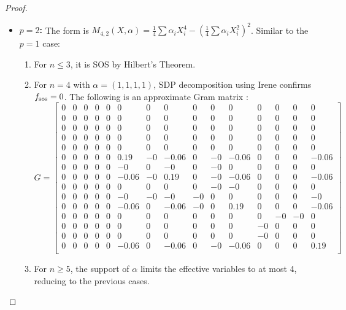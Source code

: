 \documentclass{article}
\begin{document}
\begin{proof}
\begin{itemize}
    \item \textbf{$p=2$:} The form is $M_{4,2}(X, \alpha) = \frac{1}{4}\sum \alpha_i X_i^4 - (\frac{1}{4}\sum \alpha_i X_i^2)^2$.
    Similar to the $p=1$ case:
    \begin{enumerate}
        \item For $n \leq 3$, it is SOS by Hilbert's Theorem.
        \item For $n=4$ with $\alpha=(1,1,1,1)$, SDP decomposition using Irene \cite{GMIr} confirms $f_{\rm sos}=0$. The following is an approximate Gram matrix \cite{GMIr}:
         {\scriptsize
         \setlength\arraycolsep{1.5pt}
         \[
            G = \begin{bmatrix}
            0 & 0 & 0 & 0 & 0 & 0 & 0 & 0 & 0 & 0 & 0 & 0 & 0 & 0 & 0 \\
            0 & 0 & 0 & 0 & 0 & 0 & 0 & 0 & 0 & 0 & 0 & 0 & 0 & 0 & 0 \\
            0 & 0 & 0 & 0 & 0 & 0 & 0 & 0 & 0 & 0 & 0 & 0 & 0 & 0 & 0 \\
            0 & 0 & 0 & 0 & 0 & 0 & 0 & 0 & 0 & 0 & 0 & 0 & 0 & 0 & 0 \\
            0 & 0 & 0 & 0 & 0 & 0 & 0 & 0 & 0 & 0 & 0 & 0 & 0 & 0 & 0 \\
            0 & 0 & 0 & 0 & 0 & 0.19 & -0 & -0.06 & 0 & -0 & -0.06 & 0 & 0 & 0 & -0.06 \\
            0 & 0 & 0 & 0 & 0 & -0 & 0 & -0 & 0 & -0 & 0 & 0 & 0 & 0 & 0 \\
            0 & 0 & 0 & 0 & 0 & -0.06 & -0 & 0.19 & 0 & -0 & -0.06 & 0 & 0 & 0 & -0.06 \\
            0 & 0 & 0 & 0 & 0 & 0 & 0 & 0 & 0 & -0 & -0 & 0 & 0 & 0 & 0 \\
            0 & 0 & 0 & 0 & 0 & -0 & -0 & -0 & -0 & 0 & 0 & 0 & 0 & 0 & -0 \\
            0 & 0 & 0 & 0 & 0 & -0.06 & 0 & -0.06 & -0 & 0 & 0.19 & 0 & 0 & 0 & -0.06 \\
            0 & 0 & 0 & 0 & 0 & 0 & 0 & 0 & 0 & 0 & 0 & 0 & -0 & -0 & 0 \\
            0 & 0 & 0 & 0 & 0 & 0 & 0 & 0 & 0 & 0 & 0 & -0 & 0 & 0 & 0 \\
            0 & 0 & 0 & 0 & 0 & 0 & 0 & 0 & 0 & 0 & 0 & -0 & 0 & 0 & 0 \\
            0 & 0 & 0 & 0 & 0 & -0.06 & 0 & -0.06 & 0 & -0 & -0.06 & 0 & 0 & 0 & 0.19 \\
            \end{bmatrix}
         \]
         }
        \item For $n \geq 5$, the support of $\alpha$ limits the effective variables to at most 4, reducing to the 
        previous cases.
    \end{enumerate}
\end{itemize}


\end{proof}
\end{document}
